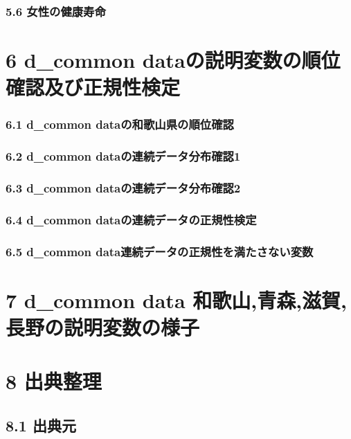 \subsection{5.6 女性の健康寿命}







\chapter{6 d\_common dataの説明変数の順位確認及び正規性検定}



\subsection{6.1 d\_common dataの和歌山県の順位確認}

\subsection{6.2 d\_common dataの連続データ分布確認1}

\subsection{6.3 d\_common dataの連続データ分布確認2}

\subsection{6.4 d\_common dataの連続データの正規性検定}

\subsection{6.5 d\_common data連続データの正規性を満たさない変数}


\chapter{7 d\_common data 和歌山,青森,滋賀,長野の説明変数の様子}





\chapter{8 出典整理}

\section{8.1 出典元}


